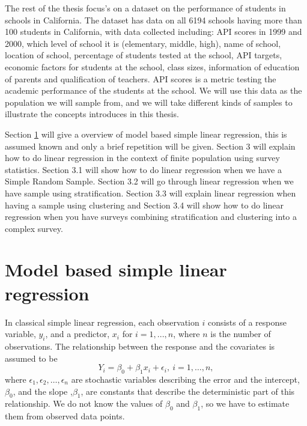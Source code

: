 \documentclass{article}
\begin{document}
The rest of the thesis focus's on a dataset on the performance of students in schools in
California. The dataset has data on all 6194 schools having more than 100
students in California, with data collected
including: API scores in 1999 and 2000, which level of school it is
(elementary, middle, high), name of school, location of school, percentage of
students tested at the school, API targets, economic factors for students at the
school, class sizes, information of education of parents and qualification of teachers.
API scores is a metric testing the academic performance of the students at the school.
We will use this data as the population we will sample from, and we will take
different kinds of samples to illustrate the concepts introduces in this thesis.

Section \ref{sec:modLinReg} will give a overview of model based simple
linear regression, this is assumed known and only a brief repetition will be given.
Section 3 will explain how to do linear regression in the context of finite
population using survey statistics. Section 3.1 will show how to do linear
regression when we have a Simple Random Sample. Section 3.2 will go through
linear regression when we have sample using stratification. Section 3.3 will
explain linear regression when having a sample using clustering and Section 3.4
will show how to do linear regression when you have surveys combining
stratification and clustering into a complex survey.



\section{Model based simple linear regression} \label{sec:modLinReg}

In classical simple linear regression, each observation \(i\) consists of a
response variable, \(y_i\), and a predictor, \(x_i\) for \(i = 1, ..., n\), where \(n\) is the number of observations. The
relationship between the response and the covariates is assumed to be
\begin{equation*}
Y_i = \beta_0 + \beta_1 x_i + \epsilon_i,\ i = 1, \dots, n,
\end{equation*}
where \(\epsilon_1, \epsilon_2, \dots, \epsilon_n\) are stochastic variables
describing the error and the intercept, \(\beta_0\), and the slope ,\(\beta_1\),
are constants that describe the deterministic part of this relationship.
We do not know the values of \(\beta_0\) and \(\beta_1\), so we have to estimate
them from observed data points.
\end{document}
